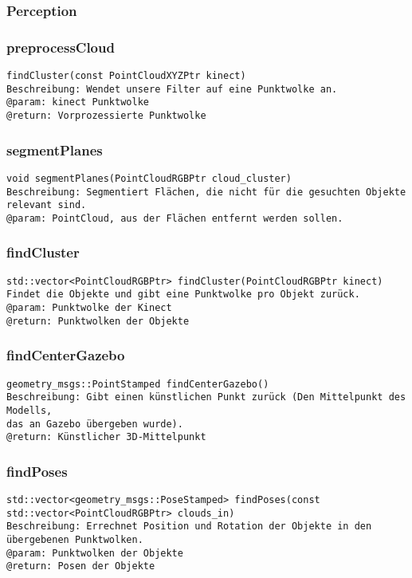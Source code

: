 \documentclass{suturo}
\begin{document}
\subsubsection*{Perception}

\subsubsection{preprocessCloud}
\begin{verbatim}
findCluster(const PointCloudXYZPtr kinect)
Beschreibung: Wendet unsere Filter auf eine Punktwolke an.
@param: kinect Punktwolke
@return: Vorprozessierte Punktwolke
\end{verbatim}\label{func:preprocesscloud}

\subsubsection{segmentPlanes}
\begin{verbatim}
void segmentPlanes(PointCloudRGBPtr cloud_cluster)
Beschreibung: Segmentiert Flächen, die nicht für die gesuchten Objekte relevant sind.
@param: PointCloud, aus der Flächen entfernt werden sollen.
\end{verbatim}\label{func:segmentplanes}

\subsubsection{findCluster}
\begin{verbatim}
std::vector<PointCloudRGBPtr> findCluster(PointCloudRGBPtr kinect)
Findet die Objekte und gibt eine Punktwolke pro Objekt zurück.
@param: Punktwolke der Kinect
@return: Punktwolken der Objekte
\end{verbatim}\label{func:findcluster}

\subsubsection{findCenterGazebo}
\begin{verbatim}
geometry_msgs::PointStamped findCenterGazebo()
Beschreibung: Gibt einen künstlichen Punkt zurück (Den Mittelpunkt des Modells, 
das an Gazebo übergeben wurde).
@return: Künstlicher 3D-Mittelpunkt
\end{verbatim}\label{func:findcentergazebo}


\subsubsection{findPoses}
\begin{verbatim}
std::vector<geometry_msgs::PoseStamped> findPoses(const std::vector<PointCloudRGBPtr> clouds_in)
Beschreibung: Errechnet Position und Rotation der Objekte in den übergebenen Punktwolken.
@param: Punktwolken der Objekte
@return: Posen der Objekte
\end{verbatim}\label{func:findposes}
\end{document}
